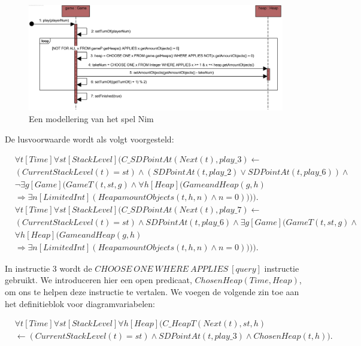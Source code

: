 \begin{figure}[H]
	\includegraphics[width=\textwidth]{chap-gedrag/seq-new-nim.png}
	\caption{Een modellering van het spel Nim}
	\label{fig:new-nim}
\end{figure}

De lusvoorwaarde wordt als volgt voorgesteld:

\begin{align}
\nonumber &\forall{t}[Time]\forall{st}[StackLevel](C\_SDPointAt(Next(t), play\_3) \leftarrow \\ \nonumber &(CurrentStackLevel(t) = st) \land (SDPointAt(t, play\_2) \lor SDPointAt(t, play\_6)) \land \\ \nonumber &\lnot{}\exists{g}[Game](GameT(t, st, g) \land{}\forall{h}[Heap](GameandHeap(g, h) \\ &\Rightarrow \exists{n}[LimitedInt](HeapamountObjects(t, h, n) \land n = 0)))). \\
\nonumber &\forall{t}[Time]\forall{st}[StackLevel](C\_SDPointAt(Next(t), play\_7) \leftarrow \\ \nonumber &(CurrentStackLevel(t) = st) \land SDPointAt(t, play\_6) \land \exists{g}[Game](GameT(t, st, g) \land \\ \nonumber &\forall{h}[Heap](GameandHeap(g, h) \\ &\Rightarrow \exists{n}[LimitedInt](HeapamountObjects(t, h, n) \land n = 0)))).
\end{align}

In instructie 3 wordt de $CHOOSE\ ONE\ WHERE\ APPLIES\ [query]$ instructie gebruikt. We introduceren hier een open predicaat, $ChosenHeap(Time, Heap)$, om ons te helpen deze instructie te vertalen. We voegen de volgende zin toe aan het definitieblok voor diagramvariabelen:

\begin{align}
\nonumber &\forall{t}[Time]\forall{st}[StackLevel]\forall{h}[Heap](C\_HeapT(Next(t), st, h) \\ &\leftarrow (CurrentStackLevel(t) = st) \land SDPointAt(t, play\_3) \land ChosenHeap(t, h)).
\end{align}

